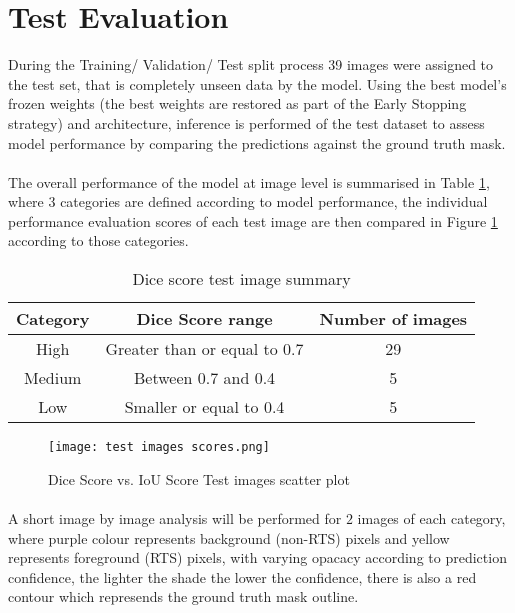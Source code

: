 \section{Test Evaluation}

During the Training/ Validation/ Test split process 39 images were assigned to the test set, that is completely unseen data by the model. Using the best model's frozen weights (the best weights are restored as part of the Early Stopping strategy) and architecture, inference is performed of the test dataset to assess model performance by comparing the predictions against the ground truth mask.

\paragraph{}
The overall performance of the model at image level is summarised in Table \ref{sum_test}, where 3 categories are defined according to model performance, the individual performance evaluation scores of each test image are then compared in Figure \ref{scatter_test_scores} according to those categories.

    \begin{table}[ht!] 
        \begin{center}
        \begin{tabular}{ccc} 
        \toprule
        \textbf{Category} & \textbf{Dice Score range}  & \textbf{Number of images}  \\ \midrule
        High & Greater than or equal to 0.7 & 29  \\
        Medium & Between 0.7 and 0.4 & 5  \\
        Low & Smaller or equal to 0.4 & 5  \\
    \bottomrule
        \end{tabular}
      \end{center} 
      \caption{Dice score test image summary}\label{sum_test}
    \end{table}
    \begin{figure}[hbt!]
        \centering
        \texttt{[image: test images scores.png]}
        \caption{Dice Score vs. \gls{IoU} Score Test images scatter plot}
        \label{scatter_test_scores}
    \end{figure}
\paragraph{}
A short image by image analysis will be performed for $2$ images of each category, where purple colour represents background (non-\gls{RTS}) pixels and yellow represents foreground (\gls{RTS}) pixels, with varying opacacy according to prediction confidence, the lighter the shade the lower the confidence, there is also a red contour which represends the ground truth mask outline.
